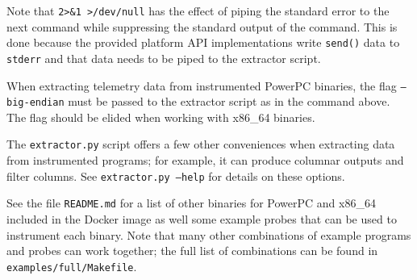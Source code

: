 Note that \texttt{2>\&1 >/dev/null} has the effect of piping the standard
  error to the next command while suppressing the standard output of the
  command. This is done because the provided platform API implementations
  write \texttt{send()} data to \texttt{stderr} and that data needs to
  be piped to the extractor script.

When extracting telemetry data from instrumented PowerPC binaries, the
  flag \texttt{--big-endian} must be passed to the extractor script as in the
  command above. The flag should be elided when working with x86\_64
  binaries.

The \texttt{extractor.py} script offers a few other conveniences when
  extracting data from instrumented programs; for example, it can produce
  columnar outputs and filter columns. See \texttt{extractor.py --help} for
  details on these options.

See the file \texttt{README.md} for a list of other binaries for
PowerPC and x86\_64 included in the Docker image as well some example
probes that can be used to instrument each binary. Note that many other
combinations of example programs and probes can work together; the full
list of combinations can be found in \texttt{examples/full/Makefile}.


  

